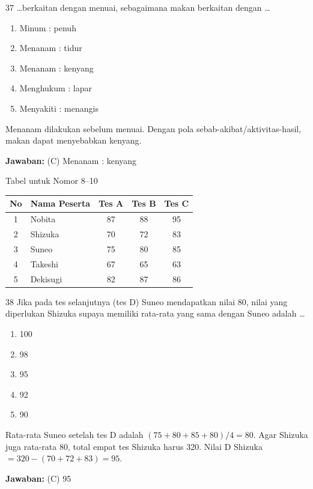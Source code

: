 \documentclass[11pt]{article}
\newenvironment{pil}{\begin{enumerate}[label=(\Alph*),leftmargin=*,itemsep=1pt,topsep=3pt]}{\end{enumerate}}
\newcommand{\jw}[1]{\par\smallskip\begin{jawbox}\textbf{Jawaban:} #1\end{jawbox}}
\begin{document}
\begin{soalbox}{3}{7}
\ldots berkaitan dengan menuai, sebagaimana makan berkaitan dengan \ldots
\begin{pil}\item Minum : penuh \item Menanam : tidur \item Menanam : kenyang \item Menghukum : lapar \item Menyakiti : menangis\end{pil}
\end{soalbox}
\begin{pembox}
Menanam dilakukan sebelum menuai. Dengan pola sebab-akibat/aktivitas-hasil, makan dapat menyebabkan kenyang.
\jw{(C) Menanam : kenyang}
\end{pembox}

\begin{infobox}{Tabel untuk Nomor 8--10}
\begin{center}
\begin{tabular}{clccc}
\textbf{No} & \textbf{Nama Peserta} & \textbf{Tes A} & \textbf{Tes B} & \textbf{Tes C}\\\hline
1 & Nobita & 87 & 88 & 95\\
2 & Shizuka & 70 & 72 & 83\\
3 & Suneo & 75 & 80 & 85\\
4 & Takeshi & 67 & 65 & 63\\
5 & Dekisugi & 82 & 87 & 86\\
\end{tabular}
\end{center}
\end{infobox}

\begin{soalbox}{3}{8}
Jika pada tes selanjutnya (tes D) Suneo mendapatkan nilai 80, nilai yang diperlukan Shizuka supaya memiliki rata-rata yang sama dengan Suneo adalah \ldots
\begin{pil}\item 100 \item 98 \item 95 \item 92 \item 90\end{pil}
\end{soalbox}
\begin{pembox}
Rata-rata Suneo setelah tes D adalah $(75+80+85+80)/4=80$. Agar Shizuka juga rata-rata 80, total empat tes Shizuka harus 320. Nilai D Shizuka $=320-(70+72+83)=95$.
\jw{(C) 95}
\end{pembox}
\end{document}
